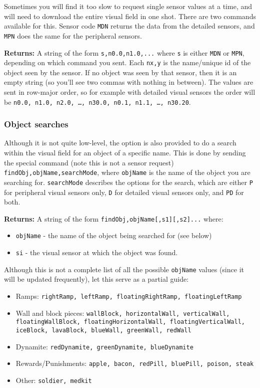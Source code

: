 Sometimes you will find it too slow to request single sensor values at a time, and will need to download the entire visual field in one shot. There are two commands available for this. Sensor code \texttt{MDN} returns the data from the detailed sensors, and \texttt{MPN} does the same for the peripheral sensors. 

\noindent \textbf{Returns:} A string of the form \texttt{s,n0.0,n1.0,...} where \texttt{s} is either \texttt{MDN} or \texttt{MPN}, depending on which command you sent. Each \texttt{nx,y} is the name/unique id of the object seen by the sensor. If no object was seen by that sensor, then it is an empty string (so you'll see two commas with nothing in between). The values are sent in row-major order, so for example with detailed visual sensors the order will be \texttt{n0.0, n1.0, n2.0, \ldots, n30.0, n0.1, n1.1, \ldots, n30.20}.

\subsubsection{Object searches}

Although it is not quite low-level, the option is also provided to do a search within the visual field for an object of a specific name. This is done by sending the special command (note this is not a sensor request) \texttt{findObj,objName,searchMode}, where \texttt{objName} is the name of the object you are searching for. \texttt{searchMode} describes the options for the search, which are either \texttt{P} for peripheral visual sensors only, \texttt{D} for detailed visual sensors only, and \texttt{PD} for both.

\noindent \textbf{Returns:} A string of the form \texttt{findObj,objName[,s1][,s2]...} where:

\begin{itemize}
\item \texttt{objName} - the name of the object being searched for (see below)
\item \texttt{si} - the visual sensor at which the object was found. 
\end{itemize}

Although this is not a complete list of all the possible \texttt{objName} values (since it will be updated frequently), let this serve as a partial guide:

\begin{itemize}
\item Ramps: \texttt{rightRamp, leftRamp, floatingRightRamp, floatingLeftRamp}
\item Wall and block pieces: \texttt{wallBlock, horizontalWall, verticalWall, floatingWallBlock, floatingHorizontalWall, floatingVerticalWall, iceBlock, lavaBlock, blueWall, greenWall, redWall}
\item Dynamite: \texttt{redDynamite, greenDynamite, blueDynamite}
\item Rewards/Punishments: \texttt{apple, bacon, redPill, bluePill, poison, steak}
\item Other: \texttt{soldier, medkit}
\end{itemize}


